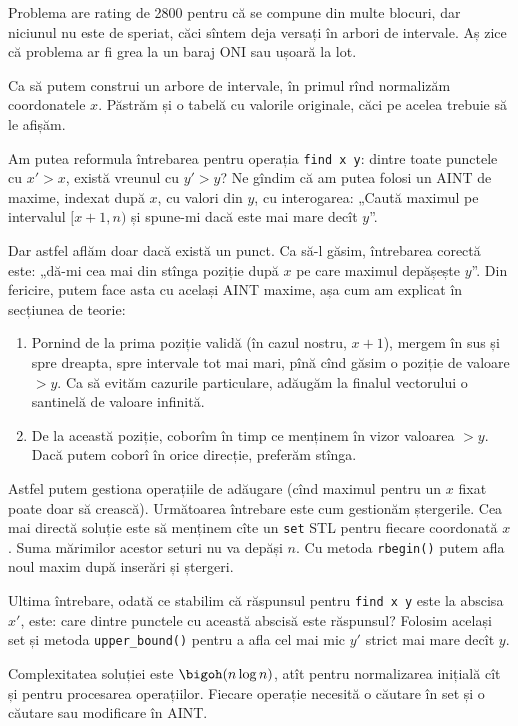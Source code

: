 Problema are rating de 2800 pentru că se compune din multe blocuri, dar niciunul nu este de speriat, căci sîntem deja versați în arbori de intervale.  Aș zice că problema ar fi grea la un baraj ONI sau ușoară la lot.

Ca să putem construi un arbore de intervale, în primul rînd normalizăm coordonatele $x$. Păstrăm și o tabelă cu valorile originale, căci pe acelea trebuie să le afișăm.

Am putea reformula întrebarea pentru operația \texttt{find x y}: dintre toate punctele cu $x'>x$, există vreunul cu $y' > y$? Ne gîndim că am putea folosi un AINT de maxime, indexat după $x$, cu valori din $y$, cu interogarea: „Caută maximul pe intervalul $[x + 1, n)$ și spune-mi dacă este mai mare decît $y$”.

Dar astfel aflăm doar dacă există un punct. Ca să-l găsim, întrebarea corectă este: „dă-mi cea mai din stînga poziție după $x$ pe care maximul depășește $y$”. Din fericire, putem face asta cu același AINT maxime, așa cum am explicat în secțiunea de teorie:

\begin{enumerate}
  \item Pornind de la prima poziție validă (în cazul nostru, $x+1$), mergem în sus și spre dreapta, spre intervale tot mai mari, pînă cînd găsim o poziție de valoare $> y$. Ca să evităm cazurile particulare, adăugăm la finalul vectorului o santinelă de valoare infinită.

  \item De la această poziție, coborîm în timp ce menținem în vizor valoarea $> y$. Dacă putem coborî în orice direcție, preferăm stînga.
\end{enumerate}

Astfel putem gestiona operațiile de adăugare (cînd maximul pentru un $x$ fixat poate doar să crească). Următoarea întrebare este cum gestionăm ștergerile. Cea mai directă soluție este să menținem cîte un \texttt{set} STL pentru fiecare coordonată $x$. Suma mărimilor acestor seturi nu va depăși $n$. Cu metoda \texttt{rbegin()} putem afla noul maxim după inserări și ștergeri.

Ultima întrebare, odată ce stabilim că răspunsul pentru \texttt{find x y} este la abscisa $x'$, este: care dintre punctele cu această abscisă este răspunsul? Folosim același set și metoda \texttt{upper_bound()} pentru a afla cel mai mic $y'$ strict mai mare decît $y$.

Complexitatea soluției este $\bigoh(n \log n)$, atît pentru normalizarea inițială cît și pentru procesarea operațiilor. Fiecare operație necesită o căutare în set și o căutare sau modificare în AINT.

